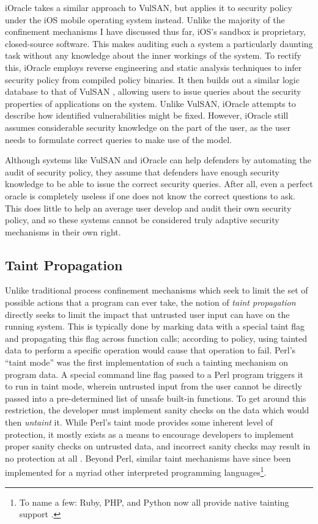 \documentclass[dvipsnames, 12pt]{article}
\begin{document}
iOracle \cite{deshotels18_ioracle} takes a similar approach to VulSAN, but
applies it to security policy under the iOS mobile operating system instead.
Unlike the majority of the confinement mechanisms I have discussed thus far,
iOS's sandbox is proprietary, closed-source software. This makes auditing such
a system a particularly daunting task without any knowledge about the inner
workings of the system. To rectify this, iOracle employs reverse engineering and
static analysis techniques to infer security policy from compiled policy
binaries. It then builds out a similar logic database to that of VulSAN
\cite{chen09_vulsan}, allowing users to issue queries about the security
properties of applications on the system. Unlike VulSAN, iOracle attempts to
describe how identified vulnerabilities might be fixed. However, iOracle still
assumes considerable security knowledge on the part of the user, as the user
needs to formulate correct queries to make use of the model.

Although systems like VulSAN and iOracle can help defenders by automating the
audit of security policy, they assume that defenders have enough security
knowledge to be able to issue the correct security queries. After all, even
a perfect oracle is completely useless if one does not know the correct
questions to ask. This does little to help an average user develop and audit
their own security policy, and so these systems cannot be considered truly
adaptive security mechanisms in their own right.

\subsection{Taint Propagation}

Unlike traditional process confinement mechanisms which seek to limit the set of
possible actions that a program can ever take, the notion of \textit{taint
propagation} directly seeks to limit the impact that untrusted user input can
have on the running system. This is typically done by marking data with
a special taint flag and propagating this flag across function calls; according
to policy, using tainted data to perform a specific operation would cause that
operation to fail.  Perl's \enquote{taint mode} \cite{hurst2004_perl} was the
first implementation of such a tainting mechanism on program data. A special
command line flag passed to a Perl program triggers it to run in taint mode,
wherein untrusted input from the user cannot be directly passed into
a pre-determined list of unsafe built-in functions. To get around this
restriction, the developer must implement sanity checks on the data which would
then \textit{untaint} it. While Perl's taint mode provides some inherent level
of protection, it mostly exists as a means to encourage developers to implement
proper sanity checks on untrusted data, and incorrect sanity checks may result
in no protection at all \cite{hurst2004_perl}. Beyond Perl, similar taint
mechanisms have since been implemented for a myriad other interpreted
programming languages\footnote{To name a few: Ruby, PHP, and Python now all
provide native tainting support \cite{conti2010_taint}.}.
\end{document}
